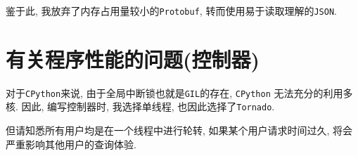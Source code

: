 鉴于此, 我放弃了内存占用量较小的\texttt{Protobuf},
转而使用易于读取理解的\texttt{JSON}.

\section{有关程序性能的问题(控制器)}

  对于\texttt{CPython}来说, 由于全局中断锁也就是\texttt{GIL}的存在, \texttt{CPython}
无法充分的利用多核. 因此, 编写控制器时, 我选择单线程, 也因此选择了\texttt{Tornado}.

但请知悉所有用户均是在一个线程中进行轮转, 如果某个用户请求时间过久,
将会严重影响其他用户的查询体验.




